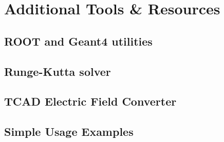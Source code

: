 \section{Additional Tools \& Resources}
\label{sec:additional_tools_resources}

\subsection{ROOT and Geant4 utilities}
\label{sec:root_and_geant4_utilities}
\wip
{}

\subsection{Runge-Kutta solver}
\wip
{}

\subsection{TCAD Electric Field Converter}
\label{sec:tcad_electric_field_converter}
\wip
{}

\subsection{Simple Usage Examples}
\wip
{}
